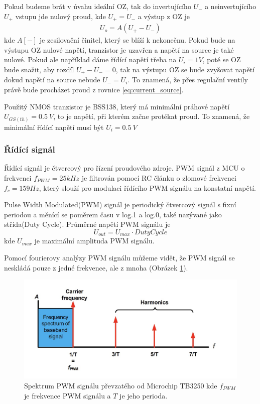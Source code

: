 Pokud budeme brát v úvahu ideální OZ, tak do invertujícího $U_-$ a neinvertujícího $U_+$ vstupu jde nulový proud, kde $U_+ = U_-$ a výstup z OZ je 
\begin{align}
    U_o = A(U_+ - U_-)
\end{align}
kde $A [-] $ je zesilovační činitel, který se blíží k nekonečnu. Pokud bude na výstupu OZ nulové napětí, tranzistor je uzavřen a napětí na source je také nulové. Pokud ale například dáme řídící napětí třeba na $U_i = 1V$, poté se OZ bude snažit, aby rozdíl $U_+ - U_- = 0$, tak na výstupu OZ se bude zvyšovat napětí dokud napětí na source nebude $U_- = U_i$. To znamená, že přes regulační ventily právě bude procházet proud z rovnice \ref{eq:current_source}. 

Použitý NMOS tranzistor je BSS138, který má minimální práhové napětí $U_{GS(th)} = 0.5 \ V$, to je napětí, při kterém začne protékat proud. To znamená, že minimální řídící napětí musí být $U_{i} = 0.5 \ V$


\subsubsection{Řídící signál}
Řídící signál je čtvercový pro řízení proudového zdroje. PWM signál z MCU o frekvenci $f_{PWM} = 25 kHz$ je filtrován pomocí RC článku o zlomové frekvenci $f_c = 159 Hz$, který slouží pro modulaci řídícího PWM signálu na konstatní napětí. 
\par
Pulse Width Modulated(PWM) signál je periodický čtvercový signál s fixní periodou a měnící se poměrem času v log.1 a log.0, také nazývané jako střída(Duty Cycle). Průměrné napětí PWM signálu je
\begin{equation}
    U_{out} = U_{max} \cdot Duty Cycle
\end{equation}
kde $U_{max}$ je maximální amplituda PWM signálu. \par


Pomocí fourierovy analýzy PWM signálu můžeme vidět, že PWM signál se neskládá pouze z jedné frekvence, ale z mnoha (Obrázek \ref{fig:pwm_spectrum}). 

\begin{figure}[H]
    \centering
    \includegraphics[width=1\linewidth]{pictures/pwm_spectrum_microchip90003250A.jpg}
    \caption{Spektrum PWM signálu převzatého od Microchip TB3250 kde $f_{PWM}$ je frekvence PWM signálu a $T$ je jeho perioda.}
    \label{fig:pwm_spectrum}
\end{figure}

